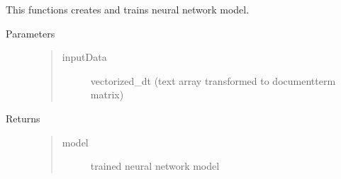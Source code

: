 \documentclass[letterpaper,10pt,english]{sphinxmanual}
\begin{document}

\begin{fulllineitems}
\label{\detokenize{ff:ff.keras}}
\pysigstartsignatures
{}
\pysigstopsignatures
\sphinxAtStartPar
This functions creates and trains neural network model.
\begin{description}
\item[{Parameters}] \leavevmode\begin{quote}\begin{description}
\item[{inputData}] \leavevmode
\sphinxAtStartPar
vectorized\_dt (text array transformed to document\sphinxhyphen{}term matrix)

\end{description}\end{quote}

\item[{Returns}] \leavevmode\begin{quote}\begin{description}
\item[{model}] \leavevmode
\sphinxAtStartPar
trained neural network model

\end{description}\end{quote}

\end{description}

\end{fulllineitems}

\end{document}
